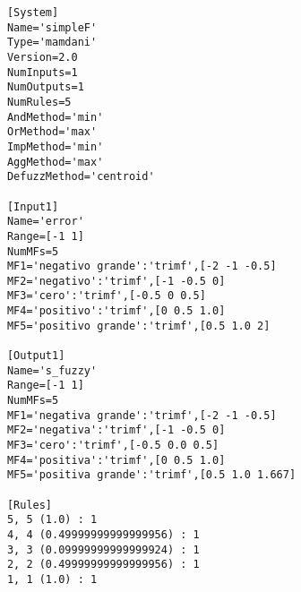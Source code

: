     \begin{longlisting}				
        \begin{verbatim}
            [System]
            Name='simpleF'
            Type='mamdani'
            Version=2.0
            NumInputs=1
            NumOutputs=1
            NumRules=5
            AndMethod='min'
            OrMethod='max'
            ImpMethod='min'
            AggMethod='max'
            DefuzzMethod='centroid'

            [Input1]
            Name='error'
            Range=[-1 1]
            NumMFs=5
            MF1='negativo grande':'trimf',[-2 -1 -0.5]
            MF2='negativo':'trimf',[-1 -0.5 0]
            MF3='cero':'trimf',[-0.5 0 0.5]
            MF4='positivo':'trimf',[0 0.5 1.0]
            MF5='positivo grande':'trimf',[0.5 1.0 2]

            [Output1]
            Name='s_fuzzy'
            Range=[-1 1]
            NumMFs=5
            MF1='negativa grande':'trimf',[-2 -1 -0.5]
            MF2='negativa':'trimf',[-1 -0.5 0]
            MF3='cero':'trimf',[-0.5 0.0 0.5]
            MF4='positiva':'trimf',[0 0.5 1.0]
            MF5='positiva grande':'trimf',[0.5 1.0 1.667]

            [Rules]
            5, 5 (1.0) : 1
            4, 4 (0.49999999999999956) : 1
            3, 3 (0.09999999999999924) : 1
            2, 2 (0.49999999999999956) : 1
            1, 1 (1.0) : 1
        \end{verbatim}
    \end{longlisting}

    

